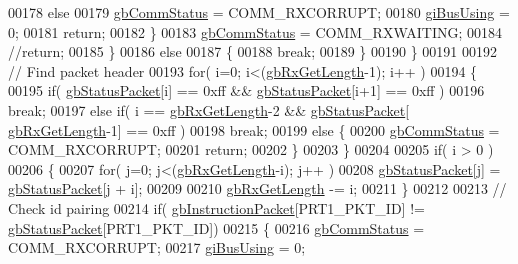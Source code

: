 \begin{DoxyCode}
00178                 \textcolor{keywordflow}{else}
00179                     \hyperlink{a00003_a5b603f6bed7ccc595f1f50bd6a6ebbfc}{gbCommStatus} = COMM\_RXCORRUPT;
00180                 \hyperlink{a00003_ad10e0e49f5fef04bf789a89c14cc470a}{giBusUsing} = 0;
00181                 \textcolor{keywordflow}{return};
00182             \}
00183             \hyperlink{a00003_a5b603f6bed7ccc595f1f50bd6a6ebbfc}{gbCommStatus} = COMM\_RXWAITING;
00184             \textcolor{comment}{//return;           }
00185         \}
00186         \textcolor{keywordflow}{else}
00187         \{
00188             \textcolor{keywordflow}{break};
00189         \}
00190     \}
00191 
00192     \textcolor{comment}{// Find packet header}
00193     \textcolor{keywordflow}{for}( i=0; i<(\hyperlink{a00003_a9d590ce24791d111c2db9b66be1e046d}{gbRxGetLength}-1); i++ )
00194     \{
00195         \textcolor{keywordflow}{if}( \hyperlink{a00003_aa57c86d3bbbeaf5c9d4f6bd00376b04f}{gbStatusPacket}[i] == 0xff && \hyperlink{a00003_aa57c86d3bbbeaf5c9d4f6bd00376b04f}{gbStatusPacket}[i+1] == 0xff )
00196             \textcolor{keywordflow}{break};
00197         \textcolor{keywordflow}{else} \textcolor{keywordflow}{if}( i == \hyperlink{a00003_a9d590ce24791d111c2db9b66be1e046d}{gbRxGetLength}-2 && \hyperlink{a00003_aa57c86d3bbbeaf5c9d4f6bd00376b04f}{gbStatusPacket}[
      \hyperlink{a00003_a9d590ce24791d111c2db9b66be1e046d}{gbRxGetLength}-1] == 0xff )
00198             \textcolor{keywordflow}{break};
00199         \textcolor{keywordflow}{else} \{
00200             \hyperlink{a00003_a5b603f6bed7ccc595f1f50bd6a6ebbfc}{gbCommStatus} = COMM\_RXCORRUPT;
00201             \textcolor{keywordflow}{return};
00202         \}
00203     \}
00204 
00205     \textcolor{keywordflow}{if}( i > 0 )
00206     \{
00207         \textcolor{keywordflow}{for}( j=0; j<(\hyperlink{a00003_a9d590ce24791d111c2db9b66be1e046d}{gbRxGetLength}-i); j++ )
00208             \hyperlink{a00003_aa57c86d3bbbeaf5c9d4f6bd00376b04f}{gbStatusPacket}[j] = \hyperlink{a00003_aa57c86d3bbbeaf5c9d4f6bd00376b04f}{gbStatusPacket}[j + i];
00209             
00210         \hyperlink{a00003_a9d590ce24791d111c2db9b66be1e046d}{gbRxGetLength} -= i;        
00211     \}
00212 
00213     \textcolor{comment}{// Check id pairing}
00214     \textcolor{keywordflow}{if}( \hyperlink{a00003_afd94dcf01b8e96298727776e222de722}{gbInstructionPacket}[PRT1\_PKT\_ID] != \hyperlink{a00003_aa57c86d3bbbeaf5c9d4f6bd00376b04f}{gbStatusPacket}[PRT1\_PKT\_ID])
00215     \{
00216         \hyperlink{a00003_a5b603f6bed7ccc595f1f50bd6a6ebbfc}{gbCommStatus} = COMM\_RXCORRUPT;
00217         \hyperlink{a00003_ad10e0e49f5fef04bf789a89c14cc470a}{giBusUsing} = 0;

\end{DoxyCode}
